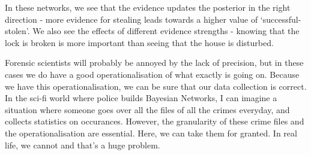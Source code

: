 In these networks, we see that the evidence updates the posterior in the right direction - more evidence for stealing leads towards a higher value of `successful-stolen'. We also see the effects of different evidence strengths - knowing that the lock is broken is more important than seeing that the house is disturbed.

Forensic scientists will probably be annoyed by the lack of precision, but in these cases we do have a good operationalisation of what exactly is going on. Because we have this operationalisation, we can be sure that our data collection is correct. In the sci-fi world where police builds Bayesian Networks, I can imagine a situation where someone goes over all the files of all the crimes everyday, and collects statistics on occurances. However, the granularity of these crime files and the operationalisation are essential. Here, we can take them for granted. In real life, we cannot and that's a huge problem. 





